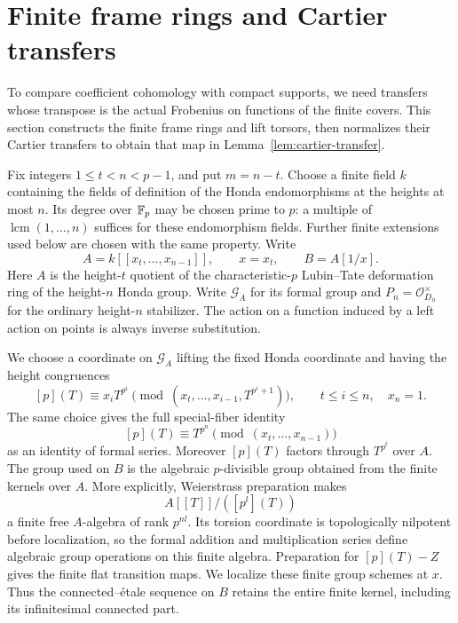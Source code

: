 \section{Finite frame rings and Cartier transfers}
\label{sec:rings}

To compare coefficient cohomology with compact supports, we need transfers
whose transpose is the actual Frobenius on functions of the finite covers. This
section constructs the finite frame rings and lift torsors, then normalizes
their Cartier transfers to obtain that map in Lemma~\ref{lem:cartier-transfer}.

Fix integers $1\leq t<n<p-1$, and put $m=n-t$.  Choose a finite
field $k$ containing the fields of definition of the Honda endomorphisms
at the heights at most $n$.  Its degree over $\mathbb F_p$ may be chosen prime
to $p$: a multiple of $\operatorname{lcm}(1,\ldots,n)$ suffices for
these endomorphism fields.  Further finite extensions used below are
chosen with the same property.  Write
\[
 A=k[[x_t,\ldots,x_{n-1}]],\qquad x=x_t,\qquad B=A[1/x].
\]
Here $A$ is the height-$t$ quotient of the characteristic-$p$
Lubin--Tate deformation ring of the height-$n$ Honda group.  Write
$\mathcal G_A$ for its formal group and
$P_n=\mathcal O_{D_n}^{\times}$ for the ordinary height-$n$
stabilizer.  The action on a function induced by a left action on
points is always inverse substitution.

We choose a coordinate on $\mathcal G_A$ lifting the fixed Honda
coordinate and having the height congruences
\begin{equation}\label{rings:height-congruences}
 [p](T)\equiv x_iT^{p^i}
 \pmod{(x_t,\ldots,x_{i-1},T^{p^i+1})},
 \qquad t\leq i\leq n,
 \quad x_n=1.
\end{equation}
The same choice gives the full special-fiber identity
\[
 [p](T)\equiv T^{p^n}\pmod{(x_t,\ldots,x_{n-1})}
\]
as an identity of formal series.  Moreover $[p](T)$ factors through
$T^{p^t}$ over $A$.
The group used on $B$ is the algebraic $p$-divisible group obtained
from the finite kernels over $A$.  More explicitly, Weierstrass
preparation makes
\[
 A[[T]]/([p^l](T))
\]
a finite free $A$-algebra of rank $p^{nl}$.  Its torsion coordinate is
topologically nilpotent before localization, so the formal addition
and multiplication series define algebraic group operations on this
finite algebra.  Preparation for $[p](T)-Z$ gives the finite flat
transition maps.  We localize these finite group schemes at $x$.
Thus the connected--\'etale sequence on $B$ retains the entire finite
kernel, including its infinitesimal connected part.

